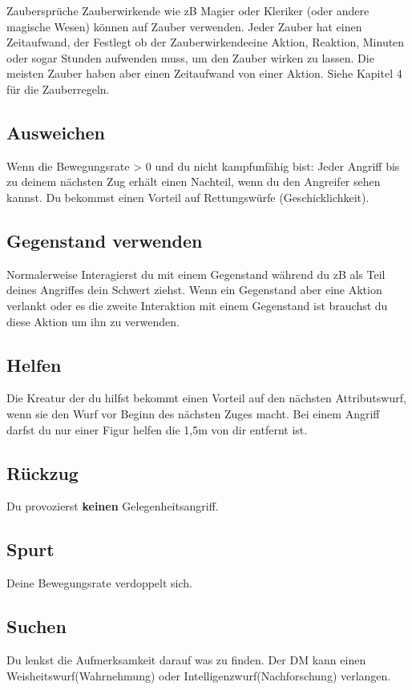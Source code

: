 \begingroup
\setthemecolor[PhbTan]
\begin{paperbox}{Zaubersprüche}
  Zauberwirkende wie zB Magier oder Kleriker (oder andere magische Wesen) können auf Zauber verwenden. Jeder Zauber hat einen Zeitaufwand, der Festlegt ob der Zauberwirkendeeine Aktion, Reaktion, Minuten oder sogar Stunden aufwenden muss, um den Zauber wirken zu lassen. Die meisten Zauber haben aber einen Zeitaufwand von einer Aktion. Siehe Kapitel 4 für die Zauberregeln.
\end{paperbox}
\endgroup

\subsection{Ausweichen}
Wenn die Bewegungsrate > 0 und du nicht kampfunfähig bist:
Jeder Angriff bis zu deinem nächsten Zug erhält einen Nachteil, wenn du den Angreifer sehen kannst. Du bekommst einen Vorteil auf Rettungswürfe (Geschicklichkeit).

\subsection{Gegenstand verwenden}
Normalerweise Interagierst du mit einem Gegenstand während du zB als Teil deines Angriffes dein Schwert ziehst. Wenn ein Gegenstand aber eine Aktion verlankt oder es die zweite Interaktion mit einem Gegenstand ist brauchst du diese Aktion um ihn zu verwenden.

\subsection{Helfen}
Die Kreatur der du hilfst bekommt einen Vorteil auf den nächsten Attributswurf, wenn sie den Wurf vor Beginn des nächsten Zuges macht. Bei einem Angriff darfst du nur einer Figur helfen die 1,5m von dir entfernt ist.

\subsection{Rückzug}
Du provozierst \textbf{keinen} Gelegenheitsangriff.

\subsection{Spurt}
Deine Bewegungsrate verdoppelt sich.

\subsection{Suchen}
Du lenkst die Aufmerksamkeit darauf was zu finden. Der DM kann einen Weisheitswurf(Wahrnehmung) oder Intelligenzwurf(Nachforschung) verlangen.

